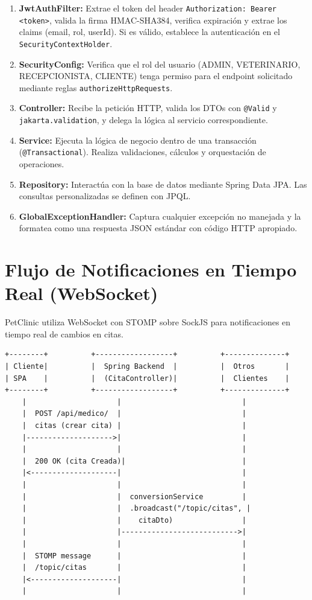 \begin{enumerate}
    \item \textbf{JwtAuthFilter:} Extrae el token del header \texttt{Authorization: Bearer <token>}, valida la firma HMAC-SHA384, verifica expiraci\'on y extrae los claims (email, rol, userId). Si es v\'alido, establece la autenticaci\'on en el \texttt{SecurityContextHolder}.
    \item \textbf{SecurityConfig:} Verifica que el rol del usuario (ADMIN, VETERINARIO, RECEPCIONISTA, CLIENTE) tenga permiso para el endpoint solicitado mediante reglas \texttt{authorizeHttpRequests}.
    \item \textbf{Controller:} Recibe la petici\'on HTTP, valida los DTOs con \texttt{@Valid} y \texttt{jakarta.validation}, y delega la l\'ogica al servicio correspondiente.
    \item \textbf{Service:} Ejecuta la l\'ogica de negocio dentro de una transacci\'on (\texttt{@Transactional}). Realiza validaciones, c\'alculos y orquestaci\'on de operaciones.
    \item \textbf{Repository:} Interact\'ua con la base de datos mediante Spring Data JPA. Las consultas personalizadas se definen con JPQL.
    \item \textbf{GlobalExceptionHandler:} Captura cualquier excepci\'on no manejada y la formatea como una respuesta JSON est\'andar con c\'odigo HTTP apropiado.
\end{enumerate}

\section{Flujo de Notificaciones en Tiempo Real (WebSocket)}

PetClinic utiliza WebSocket con STOMP sobre SockJS para notificaciones en tiempo real de cambios en citas.

\begin{verbatim}
+--------+          +------------------+          +--------------+
| Cliente|          |  Spring Backend  |          |  Otros       |
| SPA    |          |  (CitaController)|          |  Clientes    |
+--------+          +------------------+          +--------------+
    |                     |                            |
    |  POST /api/medico/  |                            |
    |  citas (crear cita) |                            |
    |-------------------->|                            |
    |                     |                            |
    |  200 OK (cita Creada)|                           |
    |<--------------------|                            |
    |                     |                            |
    |                     |  conversionService         |
    |                     |  .broadcast("/topic/citas", |
    |                     |    citaDto)                |
    |                     |--------------------------->|
    |                     |                            |
    |  STOMP message      |                            |
    |  /topic/citas       |                            |
    |<--------------------|                            |
    |                     |                            |
\end{verbatim}

